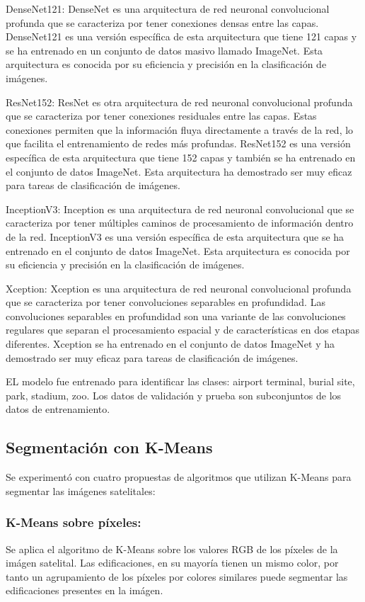 \documentclass[article]{llncs}
\begin{document}
DenseNet121: DenseNet es una arquitectura de red neuronal convolucional profunda que se caracteriza por tener conexiones 
densas entre las capas. DenseNet121 es una versión específica de esta arquitectura que tiene 121 capas y se ha entrenado 
en un conjunto de datos masivo llamado ImageNet. Esta arquitectura es conocida por su eficiencia y precisión en la 
clasificación de imágenes.

ResNet152: ResNet es otra arquitectura de red neuronal convolucional profunda que se caracteriza por tener conexiones 
residuales entre las capas. Estas conexiones permiten que la información fluya directamente a través de la red, lo que 
facilita el entrenamiento de redes más profundas. ResNet152 es una versión específica de esta arquitectura que tiene 152 
capas y también se ha entrenado en el conjunto de datos ImageNet. Esta arquitectura ha demostrado ser muy eficaz para 
tareas de clasificación de imágenes.

InceptionV3: Inception es una arquitectura de red neuronal convolucional que se caracteriza por tener múltiples caminos 
de procesamiento de información dentro de la red. InceptionV3 es una versión específica de esta arquitectura que se ha 
entrenado en el conjunto de datos ImageNet. Esta arquitectura es conocida por su eficiencia y precisión en la 
clasificación de imágenes.

Xception: Xception es una arquitectura de red neuronal convolucional profunda que se caracteriza por tener convoluciones 
separables en profundidad. Las convoluciones separables en profundidad son una variante de las convoluciones regulares 
que separan el procesamiento espacial y de características en dos etapas diferentes. Xception se ha entrenado en el 
conjunto de datos ImageNet y ha demostrado ser muy eficaz para tareas de clasificación de imágenes.

EL modelo fue entrenado para identificar las clases: airport terminal, burial site, park, stadium, zoo. Los datos de validaci\'on y prueba 
son subconjuntos de los datos de entrenamiento.

\subsection{Segmentaci\'on con K-Means}

Se experiment\'o con cuatro propuestas de algoritmos que utilizan K-Means para segmentar las im\'agenes satelitales:

\subsubsection{K-Means sobre p\'ixeles:}
Se aplica el algoritmo de K-Means sobre los valores RGB de los p\'ixeles de la im\'agen satelital. Las edificaciones, 
en su mayor\'ia tienen un mismo color, por tanto un agrupamiento de los p\'ixeles por colores similares puede segmentar 
las edificaciones presentes en la im\'agen.
\end{document}
